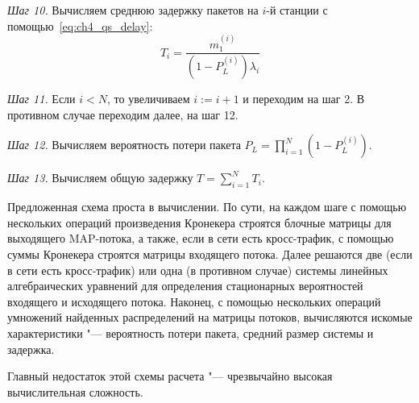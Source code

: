 \textit{Шаг 10.} Вычисляем среднюю задержку пакетов на $i$-й станции с помощью~\eqref{eq:ch4_qs_delay}:
$$
  T_i = \frac{m_1^{(i)}}{(1 - P_L^{(i)}) \lambda_i}
$$

\textit{Шаг 11.} Если $i < N$, то увеличиваем $i := i + 1$ и переходим на шаг 2. В противном случае переходим далее, на шаг 12.

\textit{Шаг 12.} Вычисляем вероятность потери пакета $P_L = \prod\limits_{i=1}^{N} (1 - P_L^{(i)})$.

\textit{Шаг 13.} Вычисляем общую задержку $T = \sum\limits_{i=1}^{N} T_i$.

Предложенная схема проста в вычислении. По сути, на каждом шаге с помощью нескольких операций произведения Кронекера строятся блочные матрицы для выходящего MAP-потока, а также, если в сети есть кросс-трафик, с помощью суммы Кронекера строятся матрицы входящего потока. Далее решаются две (если в сети есть кросс-трафик) или одна (в противном случае) системы линейных алгебраических уравнений для определения стационарных вероятностей входящего и исходящего потока. Наконец, с помощью нескольких операций умножений найденных распределений на матрицы потоков, вычисляются искомые характеристики "--- вероятность потери пакета, средний размер системы и задержка.

Главный недостаток этой схемы расчета "--- чрезвычайно высокая вычислительная сложность.

